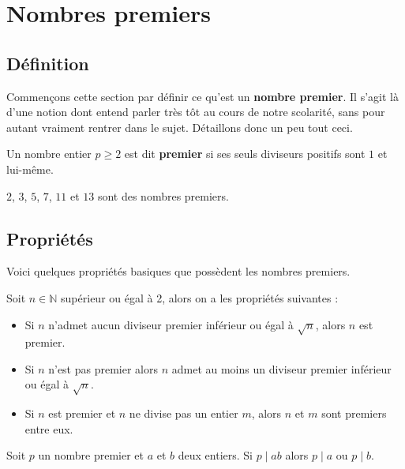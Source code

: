 	\section{Nombres premiers}

	\subsection{Définition}

	Commençons cette section par définir ce qu'est un \textbf{nombre premier}. Il s'agit là d'une notion dont entend parler très tôt au cours de notre scolarité, sans pour autant vraiment rentrer dans le sujet. Détaillons donc un peu tout ceci.

	\begin{formula}
		Un nombre entier $p \geq 2$ est dit \textbf{premier} si ses seuls diviseurs positifs sont $1$ et lui-même.
	\end{formula}

	\begin{tip}[Exemple]
		$2$, $3$, $5$, $7$, $11$ et $13$ sont des nombres premiers.
	\end{tip}

	\subsection{Propriétés}

	Voici quelques propriétés basiques que possèdent les nombres premiers.

	\begin{formula}[Propriétés]
		Soit $n \in \mathbb{N}$ supérieur ou égal à 2, alors on a les propriétés suivantes :
		\begin{itemize}
			\item Si $n$ n'admet aucun diviseur premier inférieur ou égal à $\sqrt{n}$, alors $n$ est premier.
			\item Si $n$ n'est pas premier alors $n$ admet au moins un diviseur premier inférieur ou égal à $\sqrt{n}$.
			\item Si $n$ est premier et $n$ ne divise pas un entier $m$, alors $n$ et $m$ sont premiers entre eux.
		\end{itemize}
	\end{formula}

	\begin{formula}
		Soit $p$ un nombre premier et $a$ et $b$ deux entiers. Si $p \mid ab$ alors $p \mid a$ ou $p \mid b$.
	\end{formula}

